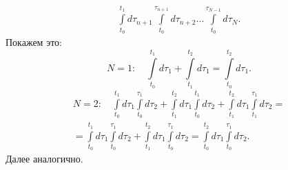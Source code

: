 \documentclass[a4paper]{article}
\begin{document}
\begin{sol}
\begin{multline*}
\int\limits_{t_0}^{t_1} d \tau_{n+1}
\int\limits_{t_0}^{\tau_{n+1}} d\tau_{n+2}\ldots
\int\limits_{t_0}^{\tau_{N-1}} d\tau_N 
.\end{multline*} 
Покажем это:
\[
N=1:\quad \int\limits_{t_0}^{t_1} d\tau_1+\int\limits_{t_1}^{t_2} d\tau_1=\int\limits_{t_0}^{t_2} d\tau_1   
.\] 
\begin{multline*}
N=2:\quad \int\limits_{t_0}^{t_1}  d\tau_1 \int\limits_{t_0}^{\tau_1} d\tau_2+
\int\limits_{t_1}^{t_2} d\tau_1 \int\limits_{t_0}^{t_1} 
d\tau_2+ \int\limits_{t_1}^{t_2} d\tau_1 \int\limits_{t_1}^{\tau_1} d\tau_2=\\=
\int\limits_{t_0}^{t_1} d\tau_1 \int\limits_{t_0}^{\tau_1} 
d\tau_2+ \int\limits_{t_1}^{t_2} d\tau_1 \int\limits_{t_0}^{\tau_1} d\tau_2= \int\limits_{t_0}^{t_2} 
d\tau_1 \int\limits_{t_0}^{\tau_1} d\tau_2 
.\end{multline*} 
Далее аналогично.
\end{sol}
\begin{hiProb}[5]
\end{hiProb}
\end{document}
